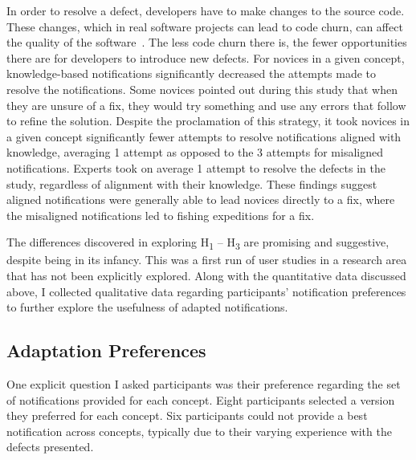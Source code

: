In order to resolve a defect, developers have to make changes to the source code. These changes, which in real software projects can lead to code churn, can affect the quality of the software~\cite{munson1998code,nagappan2005use}. The less code churn there is, the fewer opportunities there are for developers to introduce new defects. For novices in a given concept, knowledge-based notifications significantly decreased the attempts made to resolve the notifications. Some novices pointed out during this study that when they are unsure of a fix, they would try something and use any errors that follow to refine the solution.
Despite the proclamation of this strategy, it took novices in a given concept significantly fewer attempts to resolve notifications aligned with knowledge, averaging 1 attempt as opposed to the 3 attempts for misaligned notifications.
Experts took on average 1 attempt to resolve the defects in the study, regardless of alignment with their knowledge. 
These findings suggest aligned notifications were generally able to lead novices directly to a fix, where the misaligned notifications led to fishing expeditions for a fix.

\vspace{1em}
\vspace{1em}


The differences discovered in exploring H\textsubscript{1} -- H\textsubscript{3} are promising and suggestive, despite being in its infancy. This was a first run of user studies in a research area that has not been explicitly explored. Along with the quantitative data discussed above, I collected qualitative data regarding participants' notification preferences to further explore the usefulness of adapted notifications.

\subsection{Adaptation Preferences}


One explicit question I asked participants was their preference regarding the set of notifications provided for each concept. 
Eight participants selected a version they preferred for each concept. 
Six participants could not provide a best notification across concepts, typically due to their varying experience with the defects presented.

